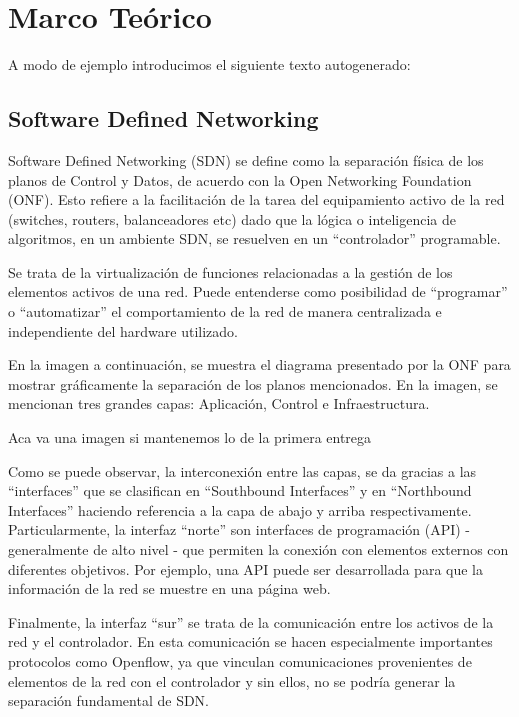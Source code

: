 \documentclass[12pt,a4paper,oneside]{book}
\begin{document}
\chapter{Marco Teórico} 
\label{marcoteorico} %

A modo de ejemplo introducimos el siguiente texto autogenerado:



\section{Software Defined Networking}
\label{marco_sdn}


Software Defined Networking (SDN) se define como la separación física de los planos de Control y Datos, de acuerdo con la Open Networking Foundation (ONF). Esto refiere a la facilitación de la tarea del equipamiento activo de la red (switches, routers, balanceadores etc) dado que la lógica o inteligencia de algoritmos, en un ambiente SDN, se resuelven en un “controlador” programable.

Se trata de la virtualización de funciones relacionadas a la gestión de los elementos activos de una red. Puede entenderse como posibilidad de “programar” o “automatizar” el comportamiento de la red de manera centralizada e independiente del hardware utilizado. 

En la imagen a continuación, se muestra el diagrama presentado por la ONF para mostrar gráficamente la separación de los planos mencionados. En la imagen, se mencionan tres grandes capas: Aplicación, Control e Infraestructura. 

Aca va una imagen si mantenemos lo de la primera entrega

Como se puede observar, la interconexión entre las capas, se da gracias a las “interfaces” que se clasifican en “Southbound Interfaces” y en “Northbound Interfaces” haciendo referencia a la capa de abajo y arriba respectivamente.
	Particularmente, la interfaz “norte” son interfaces de programación (API) - generalmente de alto nivel - que permiten la conexión con elementos externos con diferentes objetivos. Por ejemplo, una API puede ser desarrollada para que la información de la red se muestre en una página web.
	
Finalmente, la interfaz “sur” se trata de la comunicación entre los activos de la red y el controlador. En esta comunicación se hacen especialmente importantes protocolos como Openflow, ya que vinculan comunicaciones provenientes de elementos de la red con el controlador y sin ellos, no se podría generar la separación fundamental de SDN.
	
\end{document}
